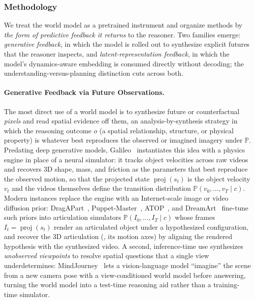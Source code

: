 \subsubsection{Methodology}

We treat the world model as a pretrained instrument and organize methods by \emph{the form of predictive feedback it returns} to the reasoner.
Two families emerge: \emph{generative feedback}, in which the model is rolled out to synthesize explicit futures that the reasoner inspects, and \emph{latent-representation feedback}, in which the model's dynamics-aware embedding is consumed directly without decoding; the understanding-versus-planning distinction cuts across both.

\paragraph{Generative Feedback via Future Observations.}
The most direct use of a world model is to synthesize future or counterfactual \emph{pixels} and read spatial evidence off them, an analysis-by-synthesis strategy in which the reasoning outcome $o$ (a spatial relationship, structure, or physical property) is whatever best reproduces the observed or imagined imagery under $\mathbb{P}$.
Predating deep generative models, Galileo~\cite{wu2015galileo} instantiates this idea with a physics engine in place of a neural simulator: it tracks object velocities across raw videos and recovers 3D shape, mass, and friction as the parameters that best reproduce the observed motion, so that the projected state $\operatorname{proj}(s_t)$ is the object velocity $v_t$ and the videos themselves define the transition distribution $\mathbb{P}(v_0, \dots, v_T \mid c)$.
Modern instances replace the engine with an Internet-scale image or video diffusion prior: DragAPart~\cite{li2024dragapart}, Puppet-Master~\cite{li2024puppetmaster}, ATOP~\cite{vora2025articulate}, and DreamArt~\cite{lu2025dreamart} fine-tune such priors into articulation simulators $\mathbb{P}(I_0, \dots, I_T \mid c)$ whose frames $I_t = \operatorname{proj}(s_t)$ render an articulated object under a hypothesized configuration, and recover the 3D articulation (\eg, its motion axes) by aligning the rendered hypothesis with the synthesized video.
A second, inference-time use synthesizes \emph{unobserved viewpoints} to resolve spatial questions that a single view underdetermines: MindJourney~\cite{yang2026mindjourney} lets a vision-language model ``imagine'' the scene from a new camera pose with a view-conditioned world model before answering, turning the world model into a test-time reasoning aid rather than a training-time simulator.
